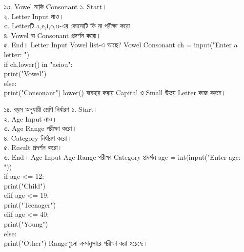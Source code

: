 \exerciseTable
{১৩. Vowel নাকি Consonant}
{
১. Start।\\
২. Letter Input নাও।\\
৩. Letterটি a,e,i,o,u-এর কোনোটি কি না পরীক্ষা করো।\\
৪. Vowel বা Consonant প্রদর্শন করো।\\
৫. End।
}
{
\binaryflow
{Letter Input}
{Vowel list-এ আছে?}
{Vowel}
{Consonant}
}
{
ch = input("Enter a letter: ")\\[0.5mm]
if ch.lower() in "aeiou":\\
\hspace*{4mm}print("Vowel")\\
else:\\
\hspace*{4mm}print("Consonant")
}
{
\textenglish{\ttfamily lower()}
ব্যবহার করায় Capital ও Small উভয় Letter কাজ করবে।
}


\exerciseTable
{১৪. বয়স অনুযায়ী শ্রেণি নির্ধারণ}
{
১. Start।\\
২. Age Input নাও।\\
৩. Age Range পরীক্ষা করো।\\
৪. Category নির্ধারণ করো।\\
৫. Result প্রদর্শন করো।\\
৬. End।
}
{
\linearflow
{Age Input}
{Age Range পরীক্ষা}
{Category প্রদর্শন}
}
{
age = int(input("Enter age: "))\\[0.5mm]
if age <= 12:\\
\hspace*{4mm}print("Child")\\
elif age <= 19:\\
\hspace*{4mm}print("Teenager")\\
elif age <= 40:\\
\hspace*{4mm}print("Young")\\
else:\\
\hspace*{4mm}print("Other")
}
{
Rangeগুলো ক্রমানুসারে পরীক্ষা করা হয়েছে।
}


